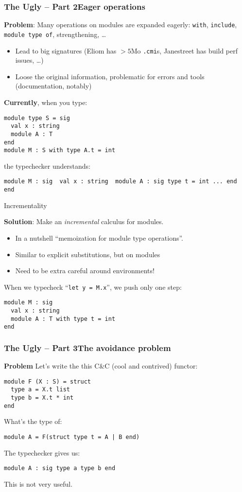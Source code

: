 \documentclass[aspectratio=169,dvipsnames,svgnames,10pt]{beamer}
\begin{document}
\begin{frame}[fragile]
  \frametitle{The Ugly -- Part 2\hfill Eager operations}

  \textbf{Problem}: Many operations on modules are expanded eagerly: \texttt{with}, \texttt{include}, \texttt{module type of}, strengthening, \dots
  \begin{itemize}
  \item Lead to big signatures (Eliom has $>5$Mo {\tt .cmi}s, Janestreet has build perf issues, \dots)
  \item Loose the original information, problematic for errors and tools (documentation, notably)
  \end{itemize}

  \pause
  \textbf{Currently}, when you type:
\begin{verbatim}
module type S = sig 
  val x : string
  module A : T
end
module M : S with type A.t = int
\end{verbatim}

  the typechecker understands:
\begin{verbatim}
module M : sig  val x : string  module A : sig type t = int ... end  end
\end{verbatim}
\end{frame}

\begin{frame}[fragile]{Incrementality}
  
  \textbf{Solution}: Make an \emph{incremental} calculus for modules.
  \begin{itemize}
  \item In a nutshell ``memoization for module type operations''.
  \item Similar to explicit substitutions, but on modules
  \item Need to be extra careful around environments!
  \end{itemize}

  When we typecheck ``\texttt{let y = M.x}'', we push only one step:
\begin{verbatim}
module M : sig
  val x : string
  module A : T with type t = int
end
\end{verbatim}
\end{frame}


\begin{frame}
  \frametitle{The Ugly -- Part 3\hfill The avoidance problem}

  \textbf{Problem} Let's write the this C\&C (cool and contrived) functor:
\begin{verbatim}
module F (X : S) = struct
  type a = X.t list
  type b = X.t * int
end
\end{verbatim}

  What's the type of:
\begin{verbatim}
module A = F(struct type t = A | B end)
\end{verbatim}
  \pause
  The typechecker gives us:
\begin{verbatim}
module A : sig type a type b end
\end{verbatim}
  This is not very useful. 
\end{frame}
\end{document}
